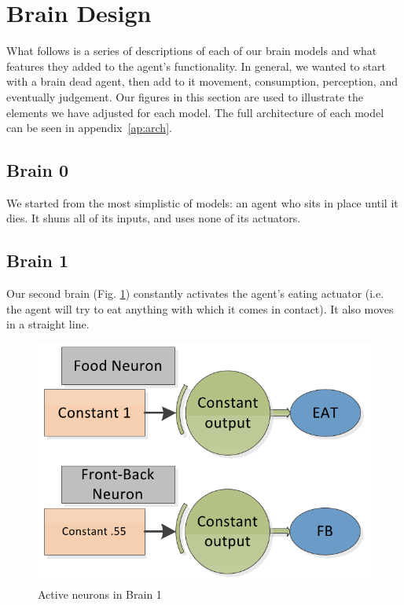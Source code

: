 \section{Brain Design} \label{sec:brain}
What follows is a series of descriptions of each of our brain models and what
features they added to the agent's functionality. In general, we wanted to 
start with a brain dead agent, then add to it movement, consumption, 
perception, and eventually judgement. Our figures in this section are used to 
illustrate the elements we have adjusted for each model. The full 
architecture of each model can be seen in appendix~\ref{ap:arch}.

\subsection{Brain 0}
We started from the most simplistic of models: an agent who sits in place until
it dies. It shuns all of its inputs, and uses none of its actuators.

\subsection{Brain 1}

Our second brain (Fig. \ref{fig:brain1}) constantly activates the agent's 
eating actuator (i.e. the agent will try to eat anything with which it comes
in contact). It also moves in a straight line.

\begin{figure}
\begin{center}
  \includegraphics[scale=.3]{img/brain1.png}
  \caption{Active neurons in Brain 1}
  \label{fig:brain1}
\end{center}
\end{figure}

